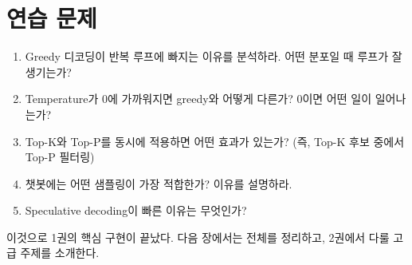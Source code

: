 \section{연습 문제}

\begin{enumerate}
  \item Greedy 디코딩이 반복 루프에 빠지는 이유를 분석하라. 어떤 분포일 때 루프가 잘 생기는가?
  \item Temperature가 0에 가까워지면 greedy와 어떻게 다른가? 0이면 어떤 일이 일어나는가?
  \item Top-K와 Top-P를 동시에 적용하면 어떤 효과가 있는가? (즉, Top-K 후보 중에서 Top-P 필터링)
  \item 챗봇에는 어떤 샘플링이 가장 적합한가? 이유를 설명하라.
  \item Speculative decoding이 빠른 이유는 무엇인가?
\end{enumerate}

이것으로 1권의 핵심 구현이 끝났다. 다음 장에서는 전체를 정리하고, 2권에서 다룰 고급 주제를 소개한다.
